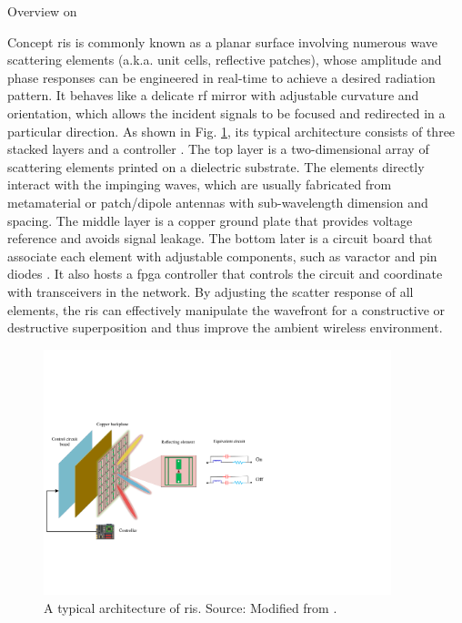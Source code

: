 \begin{section}{Overview on }
	\begin{subsection}{Concept}
		\gls{ris} is commonly known as a planar surface involving numerous wave scattering elements (a.k.a. unit cells, reflective patches), whose amplitude and phase responses can be engineered in real-time to achieve a desired radiation pattern.
		It behaves like a delicate \gls{rf} mirror with adjustable curvature and orientation, which allows the incident signals to be focused and redirected in a particular direction.
		As shown in Fig. \ref{fg:ris_architecture}, its typical architecture consists of three stacked layers and a controller \cite{Wu2020}.
		The top layer is a two-dimensional array of scattering elements printed on a dielectric substrate.
		The elements directly interact with the impinging waves, which are usually fabricated from metamaterial or patch/dipole antennas with sub-wavelength dimension and spacing.
		The middle layer is a copper ground plate that provides voltage reference and avoids signal leakage.
		The bottom later is a circuit board that associate each element with adjustable components, such as varactor and \gls{pin} diodes \cite{Dai2020}.
		It also hosts a \gls{fpga} controller that controls the circuit and coordinate with transceivers in the network.
		By adjusting the scatter response of all elements, the \gls{ris} can effectively manipulate the wavefront for a constructive or destructive superposition and thus improve the ambient wireless environment.
		\begin{figure}
			\centering
			\includegraphics[width=0.9\textwidth]{ris_architecture.pdf}
			\caption{A typical architecture of \gls{ris}. Source: Modified from \cite{Wu2020}.}
			\label{fg:ris_architecture}
		\end{figure}
	\end{subsection}


\end{section}
